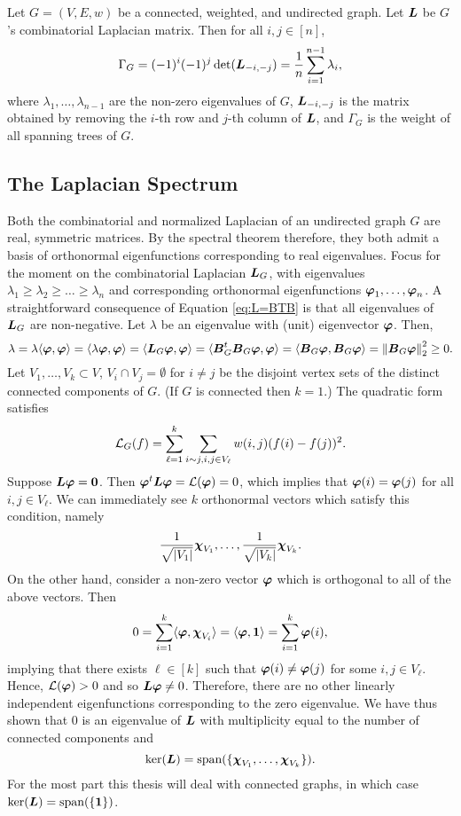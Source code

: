 \begin{theorem}
	\label{thm:matrix_tree_theorem}
	Let $G=(V,E,w)$ be a connected, weighted, and undirected graph. Let $\vb*{L}$ be $G$'s combinatorial Laplacian matrix. Then for all $i,j\in[n]$, 
	\[\Gamma_G = (-1)^i(-1)^j \det(\vb*{L}_{-i,-j}) = \frac{1}{n}\sum_{i=1}^{n-1} \lambda_i,\]
	where $\lambda_1,\dots,\lambda_{n-1}$ are the non-zero eigenvalues of $G$, $\vb*{L}_{-i,-j}$ is the matrix obtained by removing the $i$-th row and $j$-th column of $\vb*{L}$, and $\Gamma_G$ is the weight of all spanning trees of $G$.  
\end{theorem}




\subsection{The Laplacian Spectrum}
\label{sec:background_laplacian_spectrum}
Both the combinatorial and normalized Laplacian of an undirected graph $G$ are real, symmetric matrices. By the spectral theorem therefore, they both admit a basis of orthonormal eigenfunctions corresponding to real eigenvalues. Focus for the moment on the combinatorial Laplacian  $\vb*{L}_G$, with eigenvalues $\lambda_1\geq \lambda_2\geq \dots \geq \lambda_n$ and corresponding orthonormal eigenfunctions $\vb*{\varphi}_1,\dots,\vb*{\varphi}_n$. A straightforward consequence of Equation \ref{eq:L=BTB} is that all eigenvalues of $\vb*{L}_G$ are non-negative. Let $\lambda$ be an eigenvalue with (unit) eigenvector $\vb*{\varphi}$. Then,  \begin{equation*}
    \lambda = \lambda\langle \vb*{\varphi},\vb*{\varphi}\rangle = \langle \lambda \vb*{\varphi},\vb*{\varphi}\rangle = \langle \vb*{L}_G\vb*{\varphi},\vb*{\varphi}\rangle = \langle \vb*{B}_G^t \vb*{B}_G\vb*{\varphi},\vb*{\varphi}\rangle = \langle \vb*{B}_G\vb*{\varphi},\vb*{B}_G\vb*{\varphi}\rangle =\norm{\vb*{B}_G\vb*{\varphi}}_2^2 \geq 0.
\end{equation*}
Let $V_1,\dots,V_k\subset V$, $V_i\cap V_j= \emptyset$ for $i\neq j$ be the disjoint vertex sets of the distinct connected components of $G$. (If $G$ is connected then $k=1$.) The quadratic form satisfies
\[\mathcal{L}_G(f) = \sum_{\ell=1}^k \sum_{i\sim j, i,j\in V_\ell} w(i,j)(f(i)-f(j))^2. \]
Suppose $\vb*{L}\vb*{\varphi}=\vb{0}$. Then $\vb*{\varphi}^t\vb*{L}\vb*{\varphi}=\mathcal{L}(\vb*{\varphi})=0$, which implies that $\vb*{\varphi}(i)=\vb*{\varphi}(j)$ for all $i,j\in V_\ell$. We can immediately see $k$ orthonormal vectors which satisfy this condition, namely \[\frac{1}{\sqrt{|V_1|}} \boldsymbol{\chi}_{V_1},\dots, \frac{1}{\sqrt{|V_k|}} \boldsymbol{\chi}_{V_k}.\]
On the other hand, consider a non-zero vector $\vb*{\varphi}$ which is orthogonal to all of the above vectors. Then 
\[0=\sum_{i=1}^k \langle \vb*{\varphi},\boldsymbol{\chi}_{V_i}\rangle = \langle \vb*{\varphi},\vb{1} \rangle=\sum_{i=1}^k \vb*{\varphi}(i),\]
implying that there exists $\ell\in[k]$ such that $\vb*{\varphi}(i)\neq\vb*{\varphi}(j)$ for some $i,j\in V_\ell$. Hence, $\mathcal{L}(\vb*{\varphi})>0$ and so $\vb*{L}\vb*{\varphi}\neq 0$. Therefore, there are no other linearly independent eigenfunctions corresponding to the zero eigenvalue.  
We have thus shown that 0 is an eigenvalue of $\vb*{L}$ with multiplicity equal to the number of connected components and 
\[\ker(\vb*{L})=\textnormal{span}(\{\boldsymbol{\chi}_{V_1},\dots,\boldsymbol{\chi}_{V_k}\}).\]
For the most part this thesis will deal with connected graphs, in which case $\ker(\vb*{L})=\textnormal{span}(\{\vb{1}\})$.  

